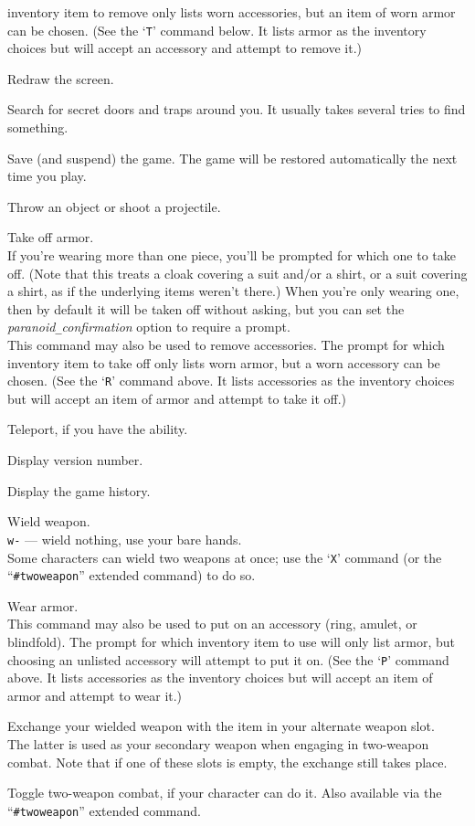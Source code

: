 inventory item to remove only lists worn accessories, but an item of
worn armor can be chosen.
(See the `{\tt T}' command below.  It lists armor as the inventory
choices but will accept an accessory and attempt to remove it.)
\item[\tb{\^{}R}]
Redraw the screen.
\item[\tb{s}]
Search for secret doors and traps around you.  It usually takes several
tries to find something.
\item[\tb{S}]
Save (and suspend) the game.  The game will be restored automatically the
next time you play.
\item[\tb{t}]
Throw an object or shoot a projectile.
\item[\tb{T}]
Take off armor.\\
If you're wearing more than one piece, you'll be prompted for which
one to take off.  (Note that this treats a cloak covering a suit
and/or a shirt, or a suit covering a shirt, as if the underlying items
weren't there.)
When you're only wearing one, then by default it will
be taken off without asking, but you can set the
{\it paranoid\verb+_+confirmation\/}
option to require a prompt.\\
This command may also be used to remove accessories.  The prompt
for which inventory item to take off only lists worn armor, but a worn
accessory can be chosen.
(See the `{\tt R}' command above.  It lists accessories as the inventory
choices but will accept an item of armor and attempt to take it off.)
\item[\tb{\^{}T}]
Teleport, if you have the ability.
\item[\tb{v}]
Display version number.
\item[\tb{V}]
Display the game history.
\item[\tb{w}]
Wield weapon.\\
{\tt w-} --- wield nothing, use your bare hands.\\
Some characters can wield two weapons at once; use the `{\tt X}' command
(or the ``{\tt \#twoweapon}'' extended command) to do so.
\item[\tb{W}]
Wear armor.\\
This command may also be used to put on an accessory (ring, amulet, or
blindfold).  The prompt for which inventory item to use will only list
armor, but choosing an unlisted accessory will attempt to put it on.
(See the `{\tt P}' command above.  It lists accessories as the inventory
choices but will accept an item of armor and attempt to wear it.)
\item[\tb{x}]
Exchange your wielded weapon with the item in your alternate weapon slot.\\
The latter is used as your secondary weapon when engaging in
two-weapon combat.  Note that if one of these slots is empty,
the exchange still takes place.
\item[\tb{X}]
Toggle two-weapon combat, if your character can do it.  Also available
via the ``{\tt \#twoweapon}'' extended command.\\

